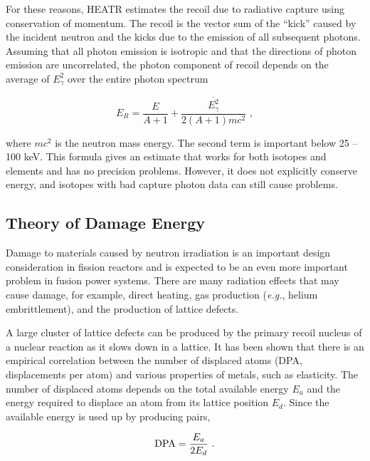 For these reasons, HEATR estimates the recoil due to radiative capture
 using conservation of momentum.  The recoil
is the vector sum of the ``kick'' caused by the incident neutron
and the kicks due to the emission of all subsequent photons.  Assuming
that all photon emission is isotropic and that the directions of
photon emission are uncorrelated, the photon component of recoil
depends on the average of $E_\gamma^2$ over the entire photon spectrum

\begin{equation}
   E_R=\frac{E}{A+1}+\frac{\overline{E_\gamma^2}}{2(A+1)mc^2}\,\,,
\end{equation}
\vspace{0.5 pt}

\noindent
where $mc^2$ is the neutron mass energy.  The second term is important
below 25 -- 100 keV.  This formula gives an estimate that works for both
isotopes and elements and has no precision problems.  However, it
does not explicitly conserve energy, and isotopes with bad capture
photon data can still cause problems.

\subsection{Theory of Damage Energy}
\label{ssHEATR_damagetheory}

Damage to materials caused by neutron
irradiation is an important design consideration in fission reactors
and is expected to be an even more important problem in fusion
power systems.  There are many radiation effects that may cause
damage, for example, direct heating, gas production ({\it e.g.},
helium embrittlement), and the production of lattice defects.

A large cluster of lattice defects can be produced by the primary
recoil nucleus of a nuclear reaction as it slows down in a lattice.
It has been shown that there is an empirical correlation between the
number of displaced atoms (DPA, displacements per atom)
and various properties of metals, such as elasticity.  The number
of displaced atoms depends on the total available energy $E_a$ and
the energy required to displace an atom from its lattice position
$E_d$.  Since the available energy is used up by producing pairs,

\begin{equation}
   {\rm DPA}=\frac{E_a}{2E_d}\,\,.
\end{equation}
\vspace{0.5 pt}

